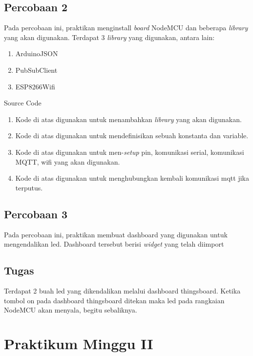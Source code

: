 \documentclass{class}
\begin{document}
    \subsection{Percobaan 2}
    Pada percobaan ini, praktikan menginstall \emph{board} NodeMCU dan beberapa \emph{library} yang akan digunakan.
    Terdapat 3 \emph{library} yang digunakan, antara lain:
    \begin{enumerate}
      \item ArduinoJSON
      \item PubSubClient
      \item ESP8266Wifi
    \end{enumerate}
    Source Code
    \begin{enumerate}
      \item 
      Kode di atas digunakan untuk menambahkan \emph{library} yang akan digunakan. \\
      \item 
      Kode di atas digunakan untuk mendefinisikan sebuah konstanta dan variable. \\
      \item 
      Kode di atas digunakan untuk men-\emph{setup} pin, komunikasi serial, komunikasi MQTT, wifi yang akan digunakan. \\
      \item 
      Kode di atas digunakan untuk menghubungkan kembali komunikasi mqtt jika terputus.
    \end{enumerate}
    
    \subsection{Percobaan 3}
    Pada percobaan ini, praktikan membuat dashboard yang digunakan untuk mengendalikan led.
    Dashboard tersebut berisi \emph{widget} yang telah diimport

    \subsection{Tugas}
    Terdapat 2 buah led yang dikendalikan melalui dashboard thingsboard. 
    Ketika tombol on pada dashboard thingsboard ditekan maka led pada rangkaian NodeMCU akan menyala, begitu sebaliknya.
    

  \section{Praktikum Minggu II}
\end{document}
